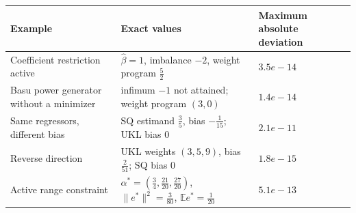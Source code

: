 \begin{tabular}{lll}
\hline
Example & Exact values & Maximum absolute deviation \\
\hline
Coefficient restriction active & $\widehat\beta=1$, imbalance $-2$, weight program $\frac{5}{2}$ & $3.5e-14$ \\
Basu power generator without a minimizer & infimum $-1$ not attained; weight program $(3,0)$ & $1.4e-14$ \\
Same regressors, different bias & SQ estimand $\frac{3}{5}$, bias $- \frac{1}{15}$; UKL bias $0$ & $2.1e-11$ \\
Reverse direction & UKL weights $(3,5,9)$, bias $\frac{2}{51}$; SQ bias $0$ & $1.8e-15$ \\
Active range constraint & $\alpha^*=(\frac{3}{4},\frac{21}{20},\frac{27}{20})$, $\|e^*\|^2=\frac{3}{80}$, $\mathbb{E} e^*=\frac{1}{20}$ & $5.1e-13$ \\
\hline
\end{tabular}
